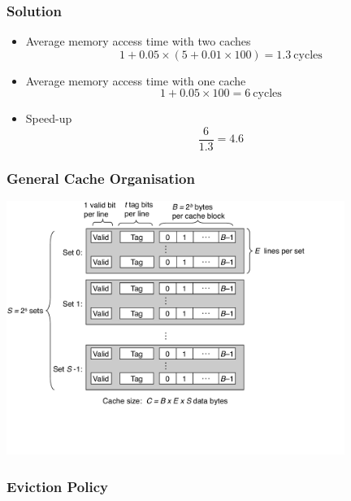 \documentclass{beamer}
\begin{document}
\begin{frame}[fragile]
\frametitle{Solution}

\begin{itemize}
\item Average memory access time with two caches
  $$
  1 + 0.05 \times (5 + 0.01 \times 100) = 1.3\ \text{cycles}
  $$

  \vspace{0.5cm}

\item Average memory access time with one cache
  $$
  1 + 0.05 \times 100 = 6\ \text{cycles}
  $$

  \vspace{0.5cm}

\item Speed-up
  $$
  \frac{6}{1.3} = 4.6
  $$

\end{itemize}

\end{frame}

\begin{frame}[fragile]
\frametitle{General Cache Organisation}

\begin{center}
\vspace*{-0.23cm}
\hspace*{-1cm}\includegraphics[width=11cm]{cacheorg.pdf}
\end{center}

\end{frame}

\begin{frame}[fragile]
\frametitle{Eviction Policy}

\end{frame}
\end{document}
